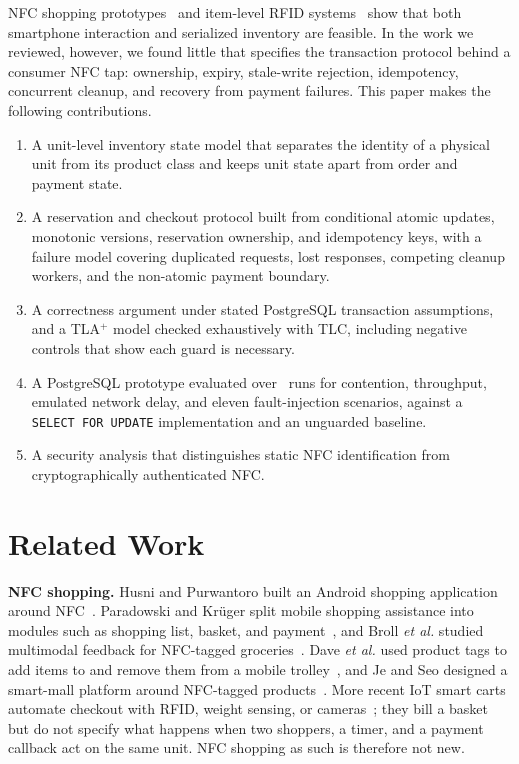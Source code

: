 \documentclass[conference]{IEEEtran}
\begin{document}
NFC shopping prototypes~\cite{refHusni,refParadowski,refBroll,refDave,refJe}
and item-level RFID systems~\cite{refHou,refChoi,refCilloni,refLi}
show that both smartphone interaction and serialized inventory are
feasible. In the work we reviewed, however, we found little that
specifies the transaction protocol behind a consumer NFC tap:
ownership, expiry, stale-write rejection, idempotency, concurrent
cleanup, and recovery from payment failures. This paper makes the
following contributions.
\begin{enumerate}
\item A unit-level inventory state model that separates the identity
of a physical unit from its product class and keeps unit state apart
from order and payment state.
\item A reservation and checkout protocol built from conditional
atomic updates, monotonic versions, reservation ownership, and
idempotency keys, with a failure model covering duplicated requests,
lost responses, competing cleanup workers, and the non-atomic payment
boundary.
\item A correctness argument under stated PostgreSQL transaction
assumptions, and a TLA$^{+}$ model checked exhaustively with TLC,
including negative controls that show each guard is necessary.
\item A PostgreSQL prototype evaluated over \NRuns\ runs for
contention, throughput, emulated network delay, and eleven
fault-injection scenarios, against a \texttt{SELECT~FOR~UPDATE}
implementation and an unguarded baseline.
\item A security analysis that distinguishes static NFC identification
from cryptographically authenticated NFC.
\end{enumerate}

\section{Related Work}
\label{sec:related}

\textbf{NFC shopping.}
Husni and Purwantoro built an Android shopping application around
NFC~\cite{refHusni}. Paradowski and Kr\"uger split mobile shopping
assistance into modules such as shopping list, basket, and
payment~\cite{refParadowski}, and Broll \emph{et al.} studied
multimodal feedback for NFC-tagged groceries~\cite{refBroll}. Dave
\emph{et al.} used product tags to add items to and remove them from a
mobile trolley~\cite{refDave}, and Je and Seo designed a smart-mall
platform around NFC-tagged products~\cite{refJe}. More recent IoT
smart carts automate checkout with RFID, weight sensing, or
cameras~\cite{refBatool,refWang}; they bill a basket but do not specify
what happens when two shoppers, a timer, and a payment callback act on
the same unit. NFC shopping as such is therefore not new.
\end{document}
